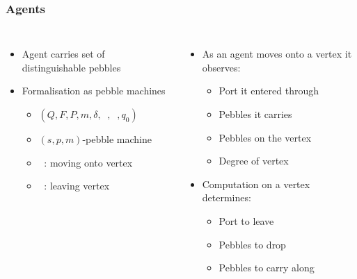 \documentclass{beamer}
\DeclareMathOperator{\din}{\delta_{\mathit{in}}}
\DeclareMathOperator{\dout}{\delta_{\mathit{out}}}
\begin{document}
\begin{frame}
  \frametitle{Agents}
  \begin{columns}
    \begin{itemize}
      \item Agent carries set of distinguishable pebbles
      \item Formalisation as pebble machines
        \begin{itemize}
          \item $(Q,F,P,m,\delta,\din,\dout,q_{0})$
          \item $(s,p,m)$-pebble machine
          \item<2-> $\din$: moving onto vertex
          \item<8-> $\dout$: leaving vertex
        \end{itemize}
    \end{itemize}
    \begin{itemize}
      \item<3-> As an agent moves onto a vertex it observes:
        \begin{itemize}
          \item<4-> Port it entered through
          \item<5-> Pebbles it carries
          \item<6-> Pebbles on the vertex
          \item<7-> Degree of vertex
        \end{itemize}
      \item<9-> Computation on a vertex determines:
        \begin{itemize}
          \item<10-> Port to leave
          \item<11-> Pebbles to drop
          \item<12-> Pebbles to carry along
        \end{itemize}
    \end{itemize}
  \end{columns}
\end{frame}
\end{document}
